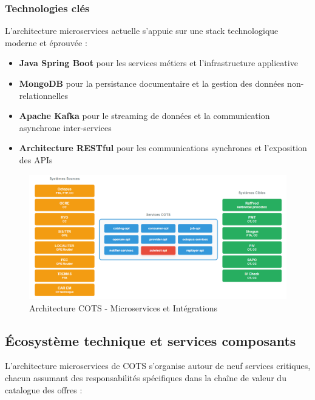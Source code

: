 \subsubsection{Technologies clés}

L'architecture microservices actuelle s'appuie sur une stack technologique moderne et éprouvée :
\begin{itemize}
    \item \textbf{Java Spring Boot} pour les services métiers et l'infrastructure applicative
    \item \textbf{MongoDB} pour la persistance documentaire et la gestion des données non-relationnelles
    \item \textbf{Apache Kafka} pour le streaming de données et la communication asynchrone inter-services
    \item \textbf{Architecture RESTful} pour les communications synchrones et l'exposition des APIs
\end{itemize}

\begin{figure}[H]
    \centering
    \includegraphics[scale=0.8]{figures/achitecture_cots.png}
    \caption{Architecture COTS - Microservices et Intégrations}
    \label{fig:architecture_cots}
\end{figure}

\subsection{Écosystème technique et services composants}

L'architecture microservices de COTS s'organise autour de neuf services critiques, chacun assumant des responsabilités spécifiques dans la chaîne de valeur du catalogue des offres :

